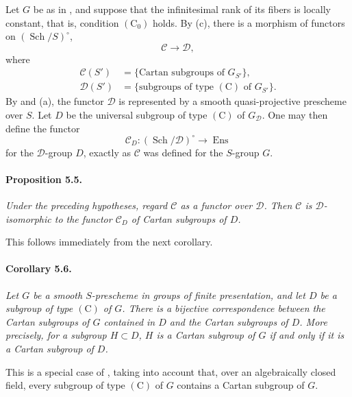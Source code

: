 Let \(G\) be as in , and suppose that the infinitesimal rank of
its fibers is locally constant, that is, condition
\((\mathrm C_0)\) holds. By \textup{(c)}, there is a morphism of
functors on \((\operatorname{Sch}/S)^\circ\),
\[
  \mathcal C\longrightarrow\mathcal D,
\]
where
\[
  \begin{aligned}
  \mathcal C(S')&=
    \{\text{Cartan subgroups of }G_{S'}\},\\
  \mathcal D(S')&=
    \{\text{subgroups of type \((\mathrm C)\) of }G_{S'}\}.
  \end{aligned}
\]
By  and \textup{(a)}, the functor \(\mathcal D\) is
represented by a smooth quasi-projective prescheme over \(S\).
Let \(D\) be the universal subgroup of type \((\mathrm C)\) of
\(G_{\mathcal D}\). One may then define the functor
\[
  \mathcal C_D\colon
  (\operatorname{Sch}/\mathcal D)^\circ
  \longrightarrow\operatorname{Ens}
\]
for the \(\mathcal D\)-group \(D\), exactly as \(\mathcal C\) was
defined for the \(S\)-group \(G\).

\paragraph{\textbf{Proposition 5.5.}}
{\itshape Under the preceding hypotheses, regard \(\mathcal C\) as
a functor over \(\mathcal D\). Then \(\mathcal C\) is
\(\mathcal D\)-isomorphic to the functor \(\mathcal C_D\) of
Cartan subgroups of \(D\).}

This follows immediately from the next corollary.

\paragraph{\textbf{Corollary 5.6.}}
{\itshape Let \(G\) be a smooth \(S\)-prescheme in groups of finite
presentation, and let \(D\) be a subgroup of type \((\mathrm C)\)
of \(G\). There is a bijective correspondence between the Cartan
subgroups of \(G\) contained in \(D\) and the Cartan subgroups of
\(D\). More precisely, for a subgroup \(H\subset D\), \(H\) is a
Cartan subgroup of \(G\) if and only if it is a Cartan subgroup of
\(D\).}

This is a special case of \textup{}, taking into account
that, over an algebraically closed field, every subgroup of type
\((\mathrm C)\) of \(G\) contains a Cartan subgroup of \(G\).

